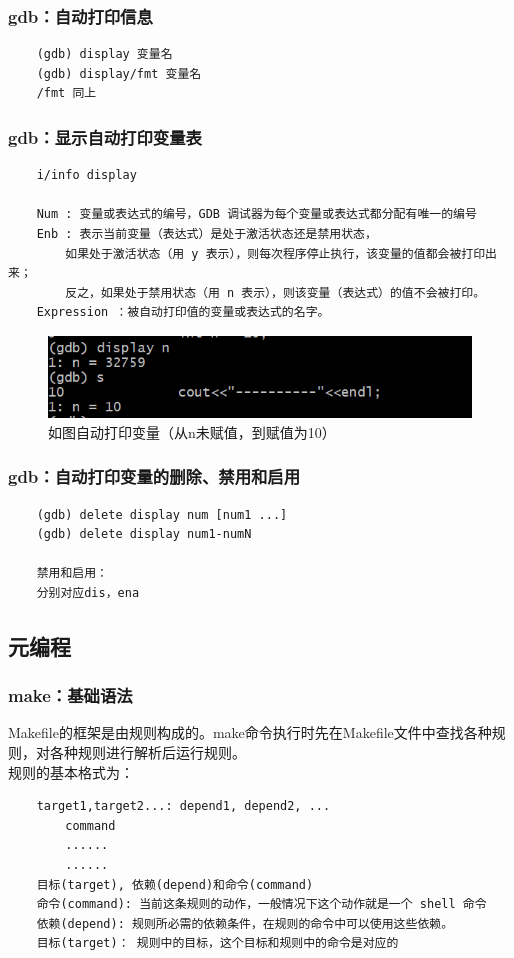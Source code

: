 \documentclass[UTF8]{ctexart}
\begin{document}
\subsubsection{gdb：自动打印信息}
\begin{verbatim}
	(gdb) display 变量名
	(gdb) display/fmt 变量名
	/fmt 同上
\end{verbatim}

\subsubsection{gdb：显示自动打印变量表}
\begin{verbatim}
	i/info display
	
	Num : 变量或表达式的编号，GDB 调试器为每个变量或表达式都分配有唯一的编号
	Enb : 表示当前变量（表达式）是处于激活状态还是禁用状态，
		如果处于激活状态（用 y 表示），则每次程序停止执行，该变量的值都会被打印出来；
		反之，如果处于禁用状态（用 n 表示），则该变量（表达式）的值不会被打印。
	Expression ：被自动打印值的变量或表达式的名字。
\end{verbatim}
\begin{figure}[H]
	\centering
	\includegraphics[width=0.7\linewidth]{figure/displayn.png}
	\caption{如图自动打印变量（从n未赋值，到赋值为10）}	
\end{figure}


\subsubsection{gdb：自动打印变量的删除、禁用和启用}
\begin{verbatim}
	(gdb) delete display num [num1 ...]
	(gdb) delete display num1-numN
	
	禁用和启用：
	分别对应dis，ena
\end{verbatim}



\subsection{元编程}
\subsubsection{make：基础语法}
Makefile的框架是由规则构成的。make命令执行时先在Makefile文件中查找各种规则，对各种规则进行解析后运行规则。
\\
\indent 规则的基本格式为：
\begin{verbatim}
	target1,target2...: depend1, depend2, ...
		command
		......
		......
	目标(target), 依赖(depend)和命令(command)	
	命令(command): 当前这条规则的动作，一般情况下这个动作就是一个 shell 命令
	依赖(depend): 规则所必需的依赖条件，在规则的命令中可以使用这些依赖。
	目标(target)： 规则中的目标，这个目标和规则中的命令是对应的
\end{verbatim}
\end{document}
